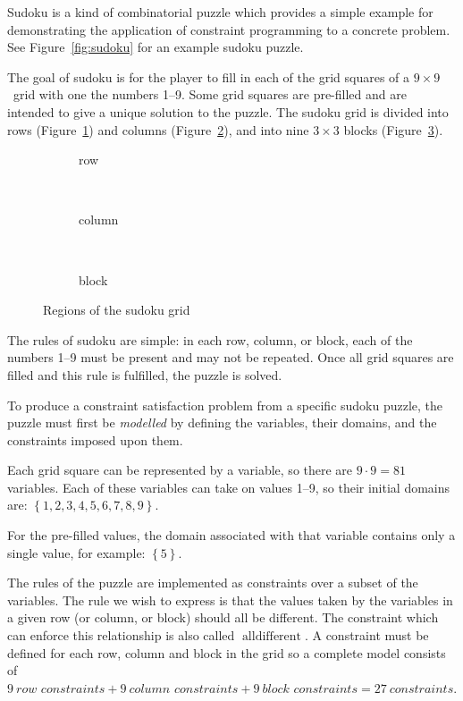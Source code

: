 \documentclass[a4paper,10pt,twoside,openright]{book}
\newcommand{\set}[1]{\left\{#1\right\}}
\DeclareMathOperator{\alldifferent}{alldifferent}
\begin{document}
Sudoku is a kind of combinatorial puzzle which provides a simple example for demonstrating the application of constraint programming to a concrete problem. See Figure~\ref{fig:sudoku} for an example sudoku puzzle. 

The goal of sudoku is for the player to fill in each of the grid squares of a $9\times9$~grid with one the numbers 1--9. Some grid squares are pre-filled and are intended to give a unique solution to the puzzle. The sudoku grid is divided into rows (Figure~\ref{fig:sudokurow}) and columns (Figure~\ref{fig:sudokucol}), and into nine $3 \times 3$ blocks (Figure~\ref{fig:sudokublock}). 
\begin{figure}[hbt]
    \centering
    \begin{subfigure}[b]{0.3\textwidth}
        \centering
        
        \caption{row}
        \label{fig:sudokurow}
    \end{subfigure}
    ~
    \begin{subfigure}[b]{0.3\textwidth}
        \centering
        
        \caption{column}
        \label{fig:sudokucol}
    \end{subfigure}
    ~
    \begin{subfigure}[b]{0.3\textwidth}
        \centering
        
        \caption{block}
        \label{fig:sudokublock}
    \end{subfigure}
    \caption{Regions of the sudoku grid}
    \label{fig:sudokuparts}
\end{figure}

The rules of sudoku are simple: in each row, column, or block, each of the numbers 1--9 must be present and may not be repeated. Once all grid squares are filled and this rule is fulfilled, the puzzle is solved.

To produce a constraint satisfaction problem from a specific sudoku puzzle, the puzzle must first be \textit{modelled} by defining the variables, their domains, and the constraints imposed upon them.

Each grid square can be represented by a variable, so there are $9 \cdot 9 = 81$ variables. Each of these variables can take on values 1--9, so their initial domains are: $\set{1,2,3,4,5,6,7,8,9}$.

For the pre-filled values, the domain associated with that variable contains only a single value, for example: $\set{5}$.

The rules of the puzzle are implemented as constraints over a subset of the variables. The rule we wish to express is that the values taken by the variables in a given row (or column, or block) should all be different. The constraint which can enforce this relationship is also called $\alldifferent$. A constraint must be defined for each row, column and block in the grid so a complete model consists of $9~\textit{row~constraints} + 9~\textit{column~constraints} + 9~\textit{block~constraints} = 27~\textit{constraints}$.
\end{document}
